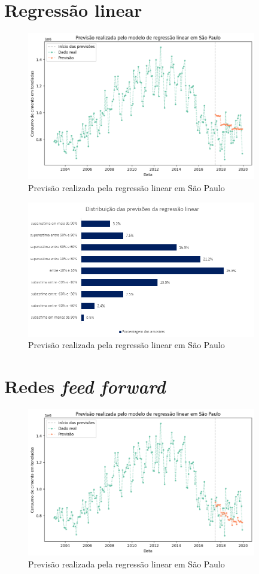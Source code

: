 \section{Regressão linear}

\begin{figure}[H]
    \centering
    \includegraphics[width=10cm]{../figuras/graficos/reg_lin/prev_sp.png}
    \caption{Previsão realizada pela regressão linear em São Paulo}
    \label{consumo-sp}
\end{figure}

\begin{figure}[H]
    \centering
    \includegraphics[width=10cm]{../figuras/graficos/reg_lin/erro-perc-rg.png}
    \caption{Previsão realizada pela regressão linear em São Paulo}
    \label{consumo-sp}
\end{figure}


\section{Redes \textit{feed forward}}

\begin{figure}[H]
    \centering
    \includegraphics[width=10cm]{../figuras/graficos/mlp/prev_sp.png}
    \caption{Previsão realizada pela regressão linear em São Paulo}
    \label{consumo-sp}
\end{figure}

